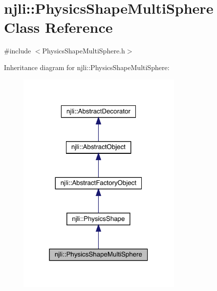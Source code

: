 \hypertarget{classnjli_1_1_physics_shape_multi_sphere}{}\section{njli\+:\+:Physics\+Shape\+Multi\+Sphere Class Reference}
\label{classnjli_1_1_physics_shape_multi_sphere}


{\ttfamily \#include $<$Physics\+Shape\+Multi\+Sphere.\+h$>$}



Inheritance diagram for njli\+:\+:Physics\+Shape\+Multi\+Sphere\+:\nopagebreak
\begin{figure}[H]
\begin{center}
\leavevmode
\includegraphics[width=231pt]{classnjli_1_1_physics_shape_multi_sphere__inherit__graph}
\end{center}
\end{figure}


